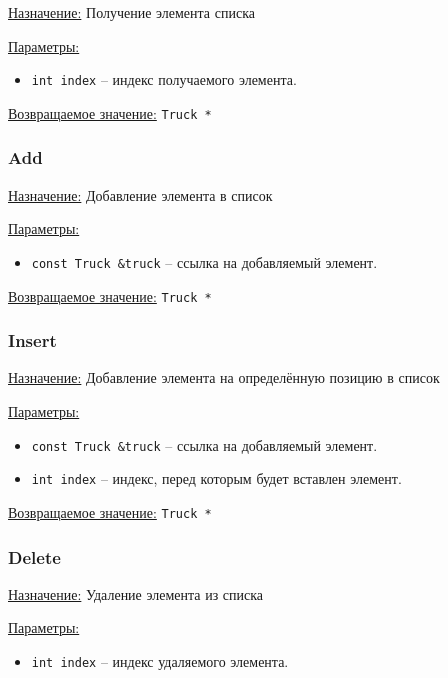 \underline{Назначение:} Получение элемента списка

\underline{Параметры:} 

\begin{itemize}
    \item \verb|int index| -- индекс получаемого элемента.
\end{itemize}

\underline{Возвращаемое значение:} \verb|Truck *|


\subsubsection*{Add}

\underline{Назначение:} Добавление элемента в список

\underline{Параметры:} 

\begin{itemize}
    \item \verb|const Truck &truck| -- ссылка на добавляемый элемент.
\end{itemize}

\underline{Возвращаемое значение:} \verb|Truck *|


\subsubsection*{Insert}

\underline{Назначение:} Добавление элемента на определённую позицию в список

\underline{Параметры:} 

\begin{itemize}
    \item \verb|const Truck &truck| -- ссылка на добавляемый элемент.
    \item \verb|int index| -- индекс, перед которым будет вставлен элемент.
\end{itemize}

\underline{Возвращаемое значение:} \verb|Truck *|


\subsubsection*{Delete}

\underline{Назначение:} Удаление элемента из списка

\underline{Параметры:} 

\begin{itemize}.
    \item \verb|int index| -- индекс удаляемого элемента.
\end{itemize}

